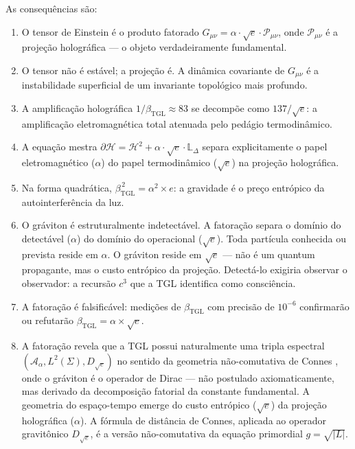 \documentclass[12pt,a4paper,twoside]{article}
\newcommand{\betatgl}{\beta_{\!\scriptscriptstyle\mathrm{TGL}}}
\begin{document}
As consequências são:

\begin{enumerate}[label=(\roman*)]
\item O tensor de Einstein é o produto fatorado $G_{\mu\nu} = \alpha \cdot \sqrt{e} \cdot \mathcal{P}_{\mu\nu}$, onde $\mathcal{P}_{\mu\nu}$ é a projeção holográfica --- o objeto verdadeiramente fundamental.

\item O tensor não é estável; a projeção é. A dinâmica covariante de $G_{\mu\nu}$ é a instabilidade superficial de um invariante topológico mais profundo.

\item A amplificação holográfica $1/\betatgl \approx 83$ se decompõe como $137/\sqrt{e}$: a amplificação eletromagnética total atenuada pelo pedágio termodinâmico.

\item A equação mestra $\partial\mathcal{H} = \mathcal{H}^2 + \alpha \cdot \sqrt{e} \cdot \mathbb{L}_\Delta$ separa explicitamente o papel eletromagnético ($\alpha$) do papel termodinâmico ($\sqrt{e}$) na projeção holográfica.

\item Na forma quadrática, $\betatgl^{\,2} = \alpha^2 \times e$: a gravidade é o preço entrópico da autointerferência da luz.

\item O gráviton é estruturalmente indetectável. A fatoração separa o domínio do detectável ($\alpha$) do domínio do operacional ($\sqrt{e}$). Toda partícula conhecida ou prevista reside em $\alpha$. O gráviton reside em $\sqrt{e}$ --- não é um quantum propagante, mas o custo entrópico da projeção. Detectá-lo exigiria observar o observador: a recursão $c^3$ que a TGL identifica como consciência.

\item A fatoração é falsificável: medições de $\betatgl$ com precisão de $10^{-6}$ confirmarão ou refutarão $\betatgl = \alpha \times \sqrt{e}$.

\item A fatoração revela que a TGL possui naturalmente uma tripla espectral $(\mathcal{A}_\alpha, L^2(\Sigma), D_{\sqrt{e}})$ no sentido da geometria não-comutativa de Connes \cite{Connes1994, Connes1996}, onde o gráviton é o operador de Dirac --- não postulado axiomaticamente, mas derivado da decomposição fatorial da constante fundamental. A geometria do espaço-tempo emerge do custo entrópico ($\sqrt{e}$) da projeção holográfica ($\alpha$). A fórmula de distância de Connes, aplicada ao operador gravitônico $D_{\sqrt{e}}$, é a versão não-comutativa da equação primordial $g = \sqrt{|L|}$.
\end{enumerate}
\end{document}

